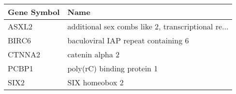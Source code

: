 \begin{tabular}{ll}
\toprule
Gene Symbol &                                               Name \\
\midrule
      ASXL2 & additional sex combs like 2, transcriptional re... \\
      BIRC6 &                baculoviral IAP repeat containing 6 \\
     CTNNA2 &                                    catenin alpha 2 \\
      PCBP1 &                         poly(rC) binding protein 1 \\
       SIX2 &                                     SIX homeobox 2 \\
\bottomrule
\end{tabular}
